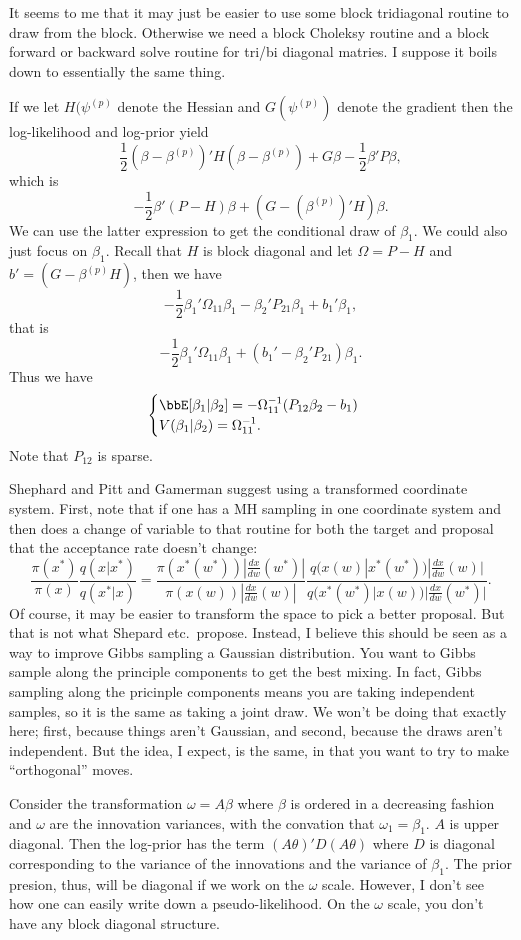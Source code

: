 \documentclass{article}
\begin{document}
It seems to me that it may just be easier to use some block tridiagonal routine
to draw from the block.  Otherwise we need a block Choleksy routine and a block
forward or backward solve routine for tri/bi diagonal matries.  I suppose it
boils down to essentially the same thing.

If we let $H(\psi^{(p)}$ denote the Hessian and $G(\psi^{(p)})$ denote the
gradient then the log-likelihood and log-prior yield
\[
\frac{1}{2} (\beta - \beta^{(p)})' H (\beta - \beta^{(p)}) + G \beta -
\frac{1}{2} \beta' P \beta,
\]
which is
\[
-\frac{1}{2} \beta' (P - H) \beta + (G - (\beta^{(p)})' H) \beta.
\]
We can use the latter expression to get the conditional draw of $\beta_1$.  We
could also just focus on $\beta_{1}$.  Recall that $H$ is block diagonal and let
$\Omega = P - H$ and $b' = (G - \beta^{(p)} H)$, then we have
\[
-\frac{1}{2} \beta_1' \Omega_{11} \beta_1 - \beta_2' P_{21} \beta_1 + b_1' \beta_1,
\]
that is
\[
-\frac{1}{2} \beta_1' \Omega_{11} \beta_1 + (b_1' - \beta_2' P_{21}) \beta_1.
\]
Thus we have
\[
\begin{cases}
\bbE[\beta_1 | \beta_2] = - \Omega_{11}^{-1} ( P_{12} \beta_2 - b_1) \\
V(\beta_1 | \beta_2) = \Omega_{11}^{-1}.
\end{cases}
\]
Note that $P_{12}$ is sparse.

Shephard and Pitt and Gamerman suggest using a transformed coordinate system.
First, note that if one has a MH sampling in one coordinate system and then
does a change of variable to that routine for both the target and proposal that
the acceptance rate doesn't change:
\[
\frac {\pi(x^*)}{\pi(x)} \frac {q(x|x^*)}{q(x^*|x)}
= \frac {\pi(x^*(w^*))  |\frac{dx}{dw}(w^*)|}{\pi(x(w)) |\frac{dx}{dw}(w)|} 
\frac{q(x(w)|x^*(w^*)) |\frac{dx}{dw}(w)|}{q(x^*(w^*)|x(w))  |\frac{dx}{dw}(w^*)|}.
\]
Of course, it may be easier to transform the space to pick a better proposal.
But that is not what Shepard etc.\ propose.  Instead, I believe this should be
seen as a way to improve Gibbs sampling a Gaussian distribution.  You want to
Gibbs sample along the principle components to get the best mixing.  In fact,
Gibbs sampling along the pricinple components means you are taking independent
samples, so it is the same as taking a joint draw.  We won't be doing that
exactly here; first, because things aren't Gaussian, and second, because the
draws aren't independent.  But the idea, I expect, is the same, in that you want
to try to make ``orthogonal'' moves.

Consider the transformation $\omega = A \beta$ where $\beta$ is ordered in a
decreasing fashion and $\omega$ are the innovation variances, with the convation
that $\omega_1 = \beta_1$.  $A$ is upper diagonal.  Then the log-prior has the
term $(A \theta)' D (A \theta)$ where $D$ is diagonal corresponding to the
variance of the innovations and the variance of $\beta_1$.  The prior presion,
thus, will be diagonal if we work on the $\omega$ scale.  However, I don't see
how one can easily write down a pseudo-likelihood.  On the $\omega$ scale, you
don't have any block diagonal structure.
\end{document}
